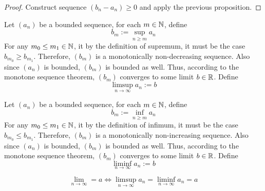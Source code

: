 \documentclass[11pt]{article}
\begin{document}
		\begin{proof}
			Construct sequence $(b_n - a_n) \geq 0$ and apply the previous proposition.
		\end{proof}
		
		\begin{definition}[limsup]
			Let $(a_n)$ be a bounded sequence, for each $m \in \mathbb{N}$, define 
			\begin{equation}
				b_m := \sup_{n \geq m}a_n
			\end{equation}
			For any $m_0 \leq m_1 \in \mathbb{N}$, it by the definition of supremum, it must be the case $b_{m_0} \geq b_{m_1}$. Therefore, $(b_m)$ is a monotonically non-decreasing sequence. Also since $(a_n)$ is bounded, $(b_m)$ is bounded as well. Thus, according to the monotone sequence theorem, $(b_m)$ converges to some limit $b \in \mathbb{R}$. Define
			\begin{equation}
				\limsup_{n \to \infty} a_n := b
			\end{equation}
		\end{definition}
		
		\begin{definition}[liminf]
			Let $(a_n)$ be a bounded sequence, for each $m \in \mathbb{N}$, define 
			\begin{equation}
				b_m := \inf_{n \geq m}a_n
			\end{equation}
			For any $m_0 \leq m_1 \in \mathbb{N}$, it by the definition of infimum, it must be the case $b_{m_0} \leq b_{m_1}$. Therefore, $(b_m)$ is a monotonically non-increasing sequence. Also since $(a_n)$ is bounded, $(b_m)$ is bounded as well. Thus, according to the monotone sequence theorem, $(b_m)$ converges to some limit $b \in \mathbb{R}$. Define
			\begin{equation}
				\liminf_{n \to \infty} a_n := b
			\end{equation}
		\end{definition}
		
		\begin{theorem}
			\begin{equation}
				\lim_{n \to \infty} = a \iff \limsup_{n \to \infty} a_n = \liminf_{n \to \infty} a_n = a
			\end{equation}
		\end{theorem}
		
\end{document}
